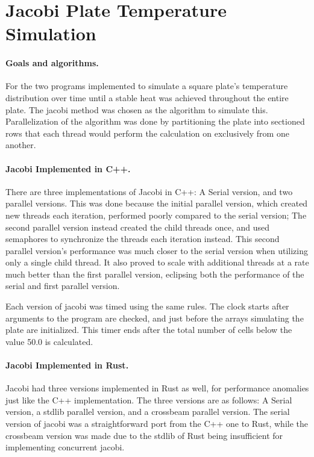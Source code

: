 \section{Jacobi Plate Temperature Simulation}
\paragraph{Goals and algorithms.}
For the two programs implemented to simulate a square plate's temperature
distribution over time until a stable heat was achieved throughout the
entire plate. The jacobi method was chosen as the algorithm to simulate this.
Parallelization of the algorithm was done by partitioning the plate into
sectioned rows that each thread would perform the calculation on exclusively
from one another.

\paragraph{Jacobi Implemented in C++.}
There are three implementations of Jacobi in C++: A Serial version, and two
parallel versions. This was done because the initial parallel version, which
created new threads each iteration, performed poorly compared to the serial
version; The second parallel version instead created the child threads once,
and used semaphores to synchronize the threads each iteration instead. This
second parallel version's performance was much closer to the serial version
when utilizing only a single child thread. It also proved to scale with
additional threads at a rate much better than the first parallel version,
eclipsing both the performance of the serial and first parallel version.

\par Each version of jacobi was timed using the same rules. The clock starts
after arguments to the program are checked, and just before the arrays
simulating the plate are initialized. This timer ends after the total number
of cells below the value 50.0 is calculated.

\paragraph{Jacobi Implemented in Rust.}
Jacobi had three versions implemented in Rust as well, for performance anomalies
just like the C++ implementation. The three versions are as follows: A Serial
version, a stdlib parallel version, and a crossbeam parallel version. The serial
version of jacobi was a straightforward port from the C++ one to Rust, while
the crossbeam version was made due to the stdlib of Rust being insufficient for
implementing concurrent jacobi.

